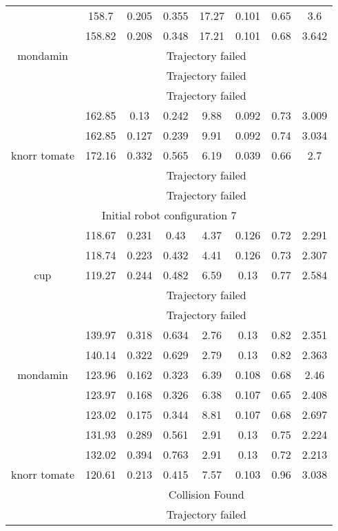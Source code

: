 {\begin{center}
\begin{longtable}[c]{ | c | c | c | c | c | c | c || c || }
\hline 
\multirow{5}{1.5cm}{mondamin}& 158.7 & 0.205 & 0.355 & 17.27 & 0.101 & 0.65 & 3.6 \\
& 158.82 & 0.208 & 0.348 & 17.21 & 0.101 & 0.68 & 3.642 \\
& \multicolumn{7}{c|}{Trajectory failed} \\
& \multicolumn{7}{c|}{Trajectory failed} \\
& \multicolumn{7}{c|}{Trajectory failed} \\
\hline 
\multirow{5}{1.5cm}{knorr tomate}& 162.85 & 0.13 & 0.242 & 9.88 & 0.092 & 0.73 & 3.009 \\
& 162.85 & 0.127 & 0.239 & 9.91 & 0.092 & 0.74 & 3.034 \\
& 172.16 & 0.332 & 0.565 & 6.19 & 0.039 & 0.66 & 2.7 \\
& \multicolumn{7}{c|}{Trajectory failed} \\
& \multicolumn{7}{c|}{Trajectory failed} \\
\hline 
\multicolumn{8}{|c|}{Initial robot configuration 7} \\
\hline
\multirow{5}{1.5cm}{cup}& 118.67 & 0.231 & 0.43 & 4.37 & 0.126 & 0.72 & 2.291 \\
& 118.74 & 0.223 & 0.432 & 4.41 & 0.126 & 0.73 & 2.307 \\
& 119.27 & 0.244 & 0.482 & 6.59 & 0.13 & 0.77 & 2.584 \\
& \multicolumn{7}{c|}{Trajectory failed} \\
& \multicolumn{7}{c|}{Trajectory failed} \\
\hline 
\multirow{5}{1.5cm}{mondamin}& 139.97 & 0.318 & 0.634 & 2.76 & 0.13 & 0.82 & 2.351 \\
& 140.14 & 0.322 & 0.629 & 2.79 & 0.13 & 0.82 & 2.363 \\
& 123.96 & 0.162 & 0.323 & 6.39 & 0.108 & 0.68 & 2.46 \\
& 123.97 & 0.168 & 0.326 & 6.38 & 0.107 & 0.65 & 2.408 \\
& 123.02 & 0.175 & 0.344 & 8.81 & 0.107 & 0.68 & 2.697 \\
\hline 
\multirow{5}{1.5cm}{knorr tomate}& 131.93 & 0.289 & 0.561 & 2.91 & 0.13 & 0.75 & 2.224 \\
& 132.02 & 0.394 & 0.763 & 2.91 & 0.13 & 0.72 & 2.213 \\
& 120.61 & 0.213 & 0.415 & 7.57 & 0.103 & 0.96 & 3.038 \\
& \multicolumn{7}{c|}{Collision Found} \\
& \multicolumn{7}{c|}{Trajectory failed} \\

\end{longtable}
\end{center}}
